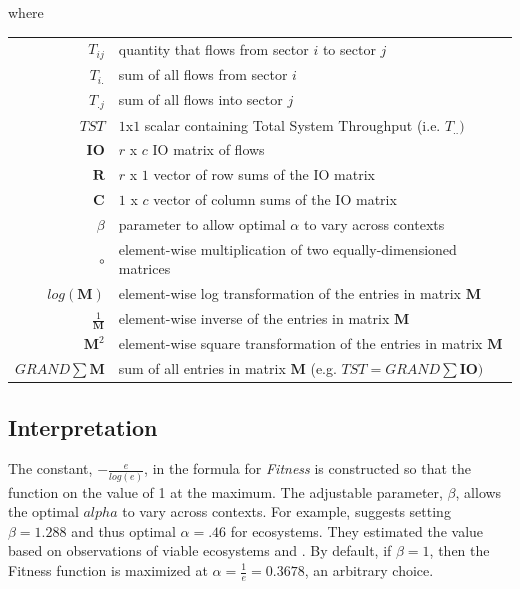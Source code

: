 \documentclass{article}
\begin{document}
where \\
\begin{tabular}{r l}
$T_{ij}$  & quantity that flows from sector $i$ to sector $j$ \\[.1in]
$T_{i.}$ & sum of all flows from sector $i$ \\
$T_{.j}$ & sum of all flows into sector $j$ \\
$TST$ & $1$x$1$ scalar containing Total System Throughput (i.e. $T_{..})$\\
$\mathbf{IO}$ & $r$ x $c$ IO matrix of flows \\
$\mathbf{R}$ &  $r$ x $1$ vector of row sums of the IO matrix\\
$\mathbf{C}$ &  $1$ x $c$ vector of column sums of the IO matrix \\
$\beta$ &  parameter to allow optimal $\alpha$ 
    to vary across contexts  \\
$\circ$ & element-wise multiplication of two equally-dimensioned
matrices\\
$log(\mathbf{M})$ & element-wise log transformation of the 
entries in matrix $\mathbf{M}$\\
$\frac{1}{\mathbf{M}}$ & element-wise inverse of the entries in 
matrix $\mathbf{M}$ \\
$\mathbf{M}^2$ & element-wise square transformation of the 
entries in matrix $\mathbf{M}$ \\
$GRAND \sum \mathbf{M}$ & sum of all entries 
in matrix $\mathbf{M}$ (e.g. $TST=GRAND\sum \mathbf{IO})$ \\


\end{tabular}


\medskip

\subsection{Interpretation}

  The constant, $-\frac{e}{log(e)}$, in the formula for \emph{Fitness} 
  is constructed so that the function on the value of 1 at the maximum. The adjustable parameter, $\beta$, 
  allows the optimal $alpha$ to vary across contexts. For example, 
  \cite{ulanowicz_quantifying_2009} suggests setting $\beta=1.288$ and 
  thus optimal $\alpha = .46$ for ecosystems. They estimated the 
  value based on observations of viable ecosystems and . By default, if $\beta=1$, then the Fitness function 
 is maximized at $\alpha = \frac{1}{e} = 0.3678$, an arbitrary choice.
\end{document}
